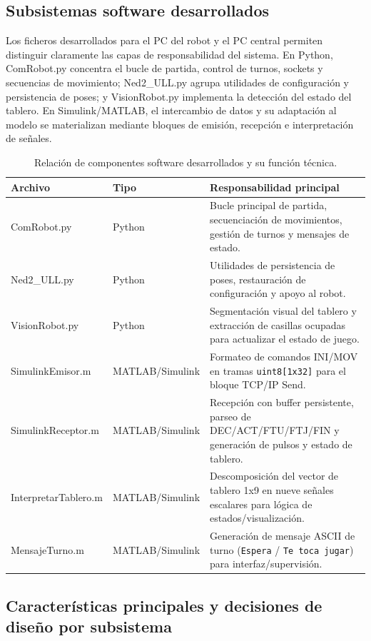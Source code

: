 \documentclass[12pt,a4paper]{article}
\begin{document}
\subsection{Subsistemas software desarrollados}
Los ficheros desarrollados para el PC del robot y el PC central permiten distinguir claramente las capas de responsabilidad del sistema. En Python, ComRobot.py concentra el bucle de partida, control de turnos, sockets y secuencias de movimiento; Ned2\_ULL.py agrupa utilidades de configuración y persistencia de poses; y VisionRobot.py implementa la detección del estado del tablero. En Simulink/MATLAB, el intercambio de datos y su adaptación al modelo se materializan mediante bloques de emisión, recepción e interpretación de señales.

\begin{table}[H]
\centering
\footnotesize
\begin{tabular}{P{0.22\textwidth} P{0.20\textwidth} P{0.48\textwidth}}
\toprule
\textbf{Archivo} & \textbf{Tipo} & \textbf{Responsabilidad principal} \\
\midrule
ComRobot.py & Python & Bucle principal de partida, secuenciación de movimientos, gestión de turnos y mensajes de estado. \\
Ned2\_ULL.py & Python & Utilidades de persistencia de poses, restauración de configuración y apoyo al robot. \\
VisionRobot.py & Python & Segmentación visual del tablero y extracción de casillas ocupadas para actualizar el estado de juego. \\
SimulinkEmisor.m & MATLAB/Simulink & Formateo de comandos INI/MOV en tramas \texttt{uint8[1x32]} para el bloque TCP/IP Send. \\
SimulinkReceptor.m & MATLAB/Simulink & Recepción con buffer persistente, parseo de DEC/ACT/FTU/FTJ/FIN y generación de pulsos y estado de tablero. \\
InterpretarTablero.m & MATLAB/Simulink & Descomposición del vector de tablero 1x9 en nueve señales escalares para lógica de estados/visualización. \\
MensajeTurno.m & MATLAB/Simulink & Generación de mensaje ASCII de turno (\texttt{Espera} / \texttt{Te toca jugar}) para interfaz/supervisión. \\
\bottomrule
\end{tabular}
\caption{Relación de componentes software desarrollados y su función técnica.}
\end{table}

\subsection{Características principales y decisiones de diseño por subsistema}
\end{document}
